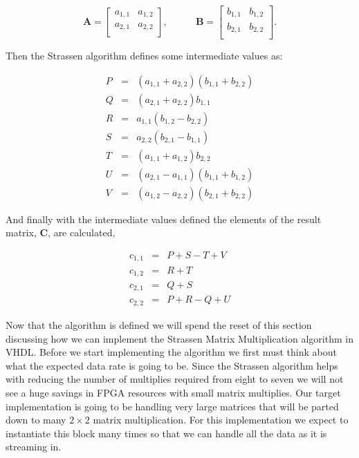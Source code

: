 \begin{equation}
\mathbf{A}=
\begin{bmatrix}
  a_{1,1} & a_{1,2} \\
  a_{2,1} & a_{2,2} \\
 \end{bmatrix},~~~~~~~~~~~~~
\mathbf{B}=
\begin{bmatrix}
  b_{1,1} & b_{1,2} \\
  b_{2,1} & b_{2,2} \\
 \end{bmatrix}.
\end{equation}

Then the Strassen algorithm defines some intermediate values as:

\begin{eqnarray}
\label{eq:capp}
P &=& (a_{1,1} + a_{2,2})(b_{1,1} + b_{2,2})\\
Q &=& (a_{2,1} + a_{2,2})b_{1,1}          \\
R &=& a_{1,1}(b_{1,2} - b_{2,2})\\
S &=& a_{2,2}(b_{2,1} - b_{1,1})\\
T &=& (a_{1,1} + a_{1,2})b_{2,2}  \\        
U &=& (a_{2,1} - a_{1,1})(b_{1,1} + b_{1,2})\\
V &=& (a_{1,2} - a_{2,2})(b_{2,1} + b_{2,2})
\label{eq:capv}
\end{eqnarray}

And finally with the intermediate values defined the elements of the result matrix, $\mathbf{C}$, are calculated,

\begin{eqnarray}
c_{1,1} &=& P + S - T + V\\
c_{1,2} &=& R + T\\
c_{2,1} &=& Q + S\\
c_{2,2} &=& P + R - Q + U
\label{eq:couts}
\end{eqnarray}

Now that the algorithm is defined we will spend the reset of this section discussing how we can implement the Strassen Matrix Multiplication algorithm in \ac{VHDL}. Before we start implementing the algorithm we first must think about what the expected data rate is going to be. Since the Strassen algorithm helps with reducing the number of multiplies required from eight to seven we will not see a huge savings in \ac{FPGA} resources with small matrix multiplies. Our target implementation is going to be handling very large matrices that will be parted down to many $2 \times 2$ matrix multiplication. For this implementation we expect to instantiate this block many times so that we can handle all the data as it is streaming in. 

